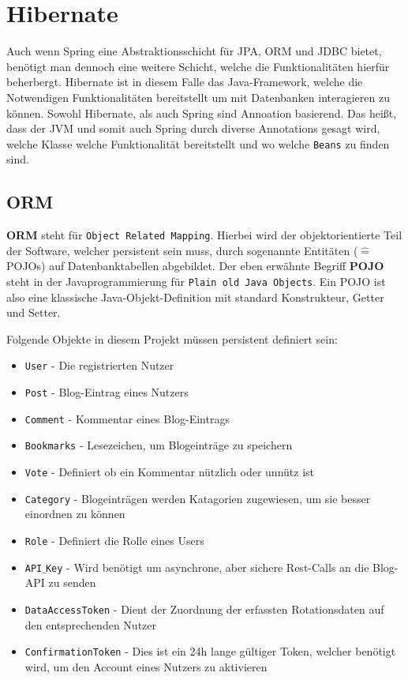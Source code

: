 \documentclass[paper=a4,12pt]{scrreprt}
\begin{document}
\section{Hibernate}

Auch wenn Spring eine Abstraktionsschicht für JPA, ORM und JDBC bietet, benötigt man dennoch eine weitere Schicht, welche die Funktionalitäten hierfür beherbergt. Hibernate\cite{hibernate} ist in diesem Falle
das Java-Framework, welche die Notwendigen Funktionalitäten bereitstellt um mit Datenbanken interagieren zu können.\newline
Sowohl Hibernate, als auch Spring sind Annoation basierend. Das heißt, dass der JVM und somit auch Spring durch diverse Annotations gesagt wird, welche Klasse welche Funktionalität bereitstellt und
wo welche \texttt{Beans} zu finden sind.\newline

\subsection{ORM}

\textbf{ORM} steht für \texttt{Object Related Mapping}. Hierbei wird der objektorientierte Teil der Software, welcher persistent sein muss, durch sogenannte Entitäten ($\hat{=}$ POJOs) auf Datenbanktabellen abgebildet.\newline
Der eben erwähnte Begriff \textbf{POJO} steht in der Javaprogrammierung für \texttt{Plain old Java Objects}. Ein POJO ist also eine klassische Java-Objekt-Definition mit standard Konstrukteur, Getter und Setter.\newline

Folgende Objekte in diesem Projekt müssen persistent definiert sein:\newline

\begin{itemize}
  \item \texttt{User} - Die registrierten Nutzer
  \item \texttt{Post} - Blog-Eintrag eines Nutzers
  \item \texttt{Comment} - Kommentar eines Blog-Eintrags
  \item \texttt{Bookmarks} - Lesezeichen, um Blogeinträge zu speichern
  \item \texttt{Vote} - Definiert ob ein Kommentar nützlich oder unnütz ist
  \item \texttt{Category} - Blogeinträgen werden Katagorien zugewiesen, um sie besser einordnen zu können
  \item \texttt{Role} - Definiert die Rolle eines Users
  \item \texttt{API$\_$Key} - Wird benötigt um asynchrone, aber sichere Rest-Calls an die Blog-API zu senden
  \item \texttt{DataAccessToken} - Dient der Zuordnung der erfassten Rotationsdaten auf den entsprechenden Nutzer
  \item \texttt{ConfirmationToken} - Dies ist ein 24h lange gültiger Token, welcher benötigt wird, um den Account eines Nutzers zu aktivieren
\end{itemize}
\end{document}
